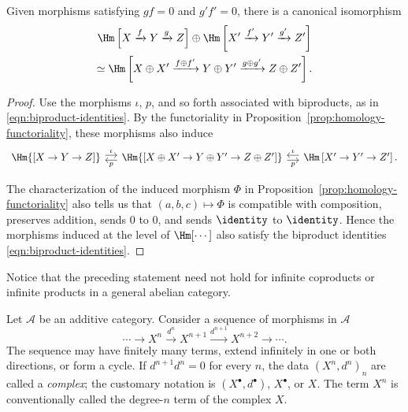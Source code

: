 \begin{proposition}\label{prop:homology-biproduct}
	Given morphisms satisfying $gf=0$ and $g'f'=0$, there is a canonical
	isomorphism
	\begin{multline*}
		\Hm\left[ X \xrightarrow{f} Y \xrightarrow{g} Z \right] \oplus \Hm\left[ X' \xrightarrow{f'} Y' \xrightarrow{g'} Z' \right] \\
		\simeq \Hm\left[ X \oplus X' \xrightarrow{f \oplus f'} Y \oplus Y' \xrightarrow{g \oplus g'} Z \oplus Z' \right].
	\end{multline*}
\end{proposition}

\begin{proof}
	Use the morphisms $\iota$, $p$, and so forth associated with biproducts, as
	in \eqref{eqn:biproduct-identities}. By the functoriality in
	Proposition~\ref{prop:homology-functoriality}, these morphisms also induce
	\[\begin{tikzcd}[column sep=small]
		\Hm{\left[ X \to Y \to Z \right]} \arrow[shift left, r, "\iota"] & \Hm{\left[ X \oplus X' \to Y \oplus Y' \to Z \oplus Z' \right]} \arrow[shift left, l, "p"] \arrow[shift right, r, "p"'] & \Hm\left[ X' \to Y' \to Z' \right] \arrow[shift right, l, "\iota"'].
	\end{tikzcd}\]

	The characterization of the induced morphism $\Phi$ in
	Proposition~\ref{prop:homology-functoriality} also tells us that
	$(a,b,c)\mapsto\Phi$ is compatible with composition, preserves addition,
	sends $0$ to $0$, and sends $\identity$ to $\identity$. Hence the morphisms
	induced at the level of $\Hm[\cdots]$ also satisfy the biproduct identities
	\eqref{eqn:biproduct-identities}.
\end{proof}

Notice that the preceding statement need not hold for infinite coproducts or
infinite products in a general abelian category.
\begin{definition}[Complexes]\label{def:complex}
	Let $\mathcal{A}$ be an additive category. Consider a sequence of morphisms
	in $\mathcal{A}$
	\[ \cdots \to X^n \xrightarrow{d^n} X^{n+1} \xrightarrow{d^{n+1}} X^{n+2} \to \cdots. \]
	The sequence may have finitely many terms, extend infinitely in one or both
	directions, or form a cycle. If $d^{n+1}d^n=0$ for every $n$, the data
	$(X^n,d^n)_n$ are called a \emph{complex}; the customary notation is
	$(X^\bullet,d^\bullet)$, $X^\bullet$, or $X$. The term $X^n$ is
	conventionally called the degree-$n$ term of the complex $X$.
\end{definition}

